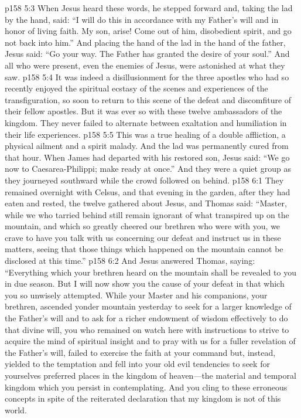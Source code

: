 \vs p158 5:3 When Jesus heard these words, he stepped forward and, taking the lad by the hand, said: \textcolor{ubdarkred}{“I will do this in accordance with my Father’s will and in honor of living faith. My son, arise! Come out of him, disobedient spirit, and go not back into him.”} And placing the hand of the lad in the hand of the father, Jesus said: \textcolor{ubdarkred}{“Go your way. The Father has granted the desire of your soul.”} And all who were present, even the enemies of Jesus, were astonished at what they saw.
\vs p158 5:4 It was indeed a disillusionment for the three apostles who had so recently enjoyed the spiritual ecstasy of the scenes and experiences of the transfiguration, so soon to return to this scene of the defeat and discomfiture of their fellow apostles. But it was ever so with these twelve ambassadors of the kingdom. They never failed to alternate between exaltation and humiliation in their life experiences.
\vs p158 5:5 This was a true healing of a double affliction, a physical ailment and a spirit malady. And the lad was permanently cured from that hour. When James had departed with his restored son, Jesus said: \textcolor{ubdarkred}{“We go now to Caesarea\hyp{}Philippi; make ready at once.”} And they were a quiet group as they journeyed southward while the crowd followed on behind.\plusone
{}
\vs p158 6:1 They remained overnight with Celsus, and that evening in the garden, after they had eaten and rested, the twelve gathered about Jesus, and Thomas said: “Master, while we who tarried behind still remain ignorant of what transpired up on the mountain, and which so greatly cheered our brethren who were with you, we crave to have you talk with us concerning our defeat and instruct us in these matters, seeing that those things which happened on the mountain cannot be disclosed at this time.”
\vs p158 6:2 And Jesus answered Thomas, saying: \textcolor{ubdarkred}{“Everything which your brethren heard on the mountain shall be revealed to you in due season. But I will now show you the cause of your defeat in that which you so unwisely attempted. While your Master and his companions, your brethren, ascended yonder mountain yesterday to seek for a larger knowledge of the Father’s will and to ask for a richer endowment of wisdom effectively to do that divine will, you who remained on watch here with instructions to strive to acquire the mind of spiritual insight and to pray with us for a fuller revelation of the Father’s will, failed to exercise the faith at your command but, instead, yielded to the temptation and fell into your old evil tendencies to seek for yourselves preferred places in the kingdom of heaven---the material and temporal kingdom which you persist in contemplating. And you cling to these erroneous concepts in spite of the reiterated declaration that my kingdom is not of this world.}
